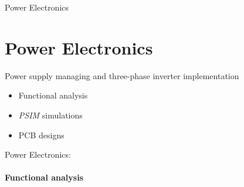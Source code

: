 \documentclass{beamer}
\begin{document}
	\author[]{Florian POUTHIER}
	\begin{frame}{Power Electronics}
		\section[ENPU]{Power Electronics}
		Power supply managing and three-phase inverter implementation
 		\begin{itemize}
			\item Functional analysis
			\item \textit{PSIM} simulations
			\item PCB designs
		\end{itemize}
	\end{frame}
	
	\begin{frame}{Power Electronics:}
		\framesubtitle{Functional analysis}

\end{frame}
\end{document}
